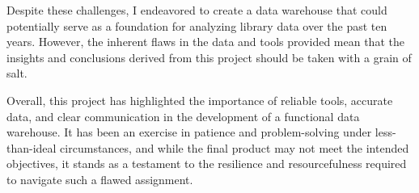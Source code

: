 \documentclass[12pt]{report}
\begin{document}
Despite these challenges, I endeavored to create a data warehouse that could potentially serve as a foundation for analyzing library data over the past ten years. However, the inherent flaws in the data and tools provided mean that the insights and conclusions derived from this project should be taken with a grain of salt.

Overall, this project has highlighted the importance of reliable tools, accurate data, and clear communication in the development of a functional data warehouse. It has been an exercise in patience and problem-solving under less-than-ideal circumstances, and while the final product may not meet the intended objectives, it stands as a testament to the resilience and resourcefulness required to navigate such a flawed assignment.





\appendix


\end{document}
